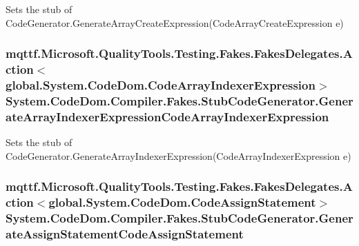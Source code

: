 Sets the stub of Code\-Generator.\-Generate\-Array\-Create\-Expression(\-Code\-Array\-Create\-Expression e)

\hypertarget{class_system_1_1_code_dom_1_1_compiler_1_1_fakes_1_1_stub_code_generator_aacb73e1e2e3f60b4993e072a81dbb8b2}{
\subsubsection[{Generate\-Array\-Indexer\-Expression\-Code\-Array\-Indexer\-Expression}]{\setlength{\rightskip}{0pt plus 5cm}mqttf.\-Microsoft.\-Quality\-Tools.\-Testing.\-Fakes.\-Fakes\-Delegates.\-Action$<$global.\-System.\-Code\-Dom.\-Code\-Array\-Indexer\-Expression$>$ System.\-Code\-Dom.\-Compiler.\-Fakes.\-Stub\-Code\-Generator.\-Generate\-Array\-Indexer\-Expression\-Code\-Array\-Indexer\-Expression}}\label{class_system_1_1_code_dom_1_1_compiler_1_1_fakes_1_1_stub_code_generator_aacb73e1e2e3f60b4993e072a81dbb8b2}


Sets the stub of Code\-Generator.\-Generate\-Array\-Indexer\-Expression(\-Code\-Array\-Indexer\-Expression e)

\hypertarget{class_system_1_1_code_dom_1_1_compiler_1_1_fakes_1_1_stub_code_generator_a1ba5ee0aa81e2c89e3042f9f109451ba}{
\subsubsection[{Generate\-Assign\-Statement\-Code\-Assign\-Statement}]{\setlength{\rightskip}{0pt plus 5cm}mqttf.\-Microsoft.\-Quality\-Tools.\-Testing.\-Fakes.\-Fakes\-Delegates.\-Action$<$global.\-System.\-Code\-Dom.\-Code\-Assign\-Statement$>$ System.\-Code\-Dom.\-Compiler.\-Fakes.\-Stub\-Code\-Generator.\-Generate\-Assign\-Statement\-Code\-Assign\-Statement}}\label{class_system_1_1_code_dom_1_1_compiler_1_1_fakes_1_1_stub_code_generator_a1ba5ee0aa81e2c89e3042f9f109451ba}


